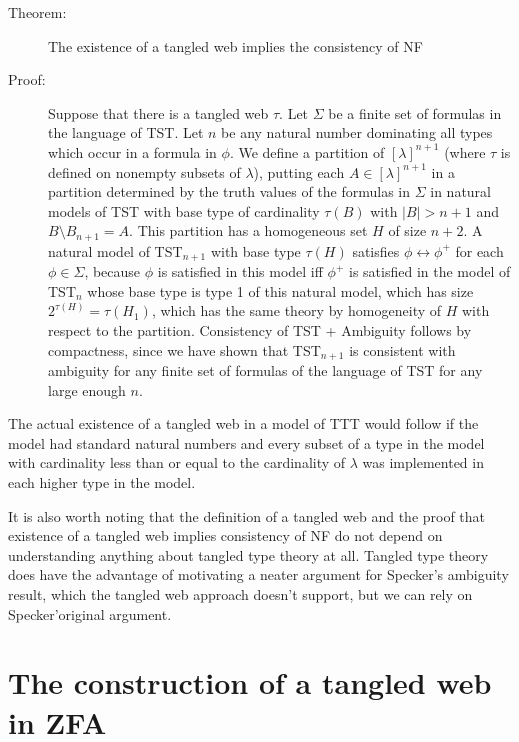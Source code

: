 \documentclass[12pt]{article}
\begin{document}
\begin{description}

\item[Theorem:]  The existence of a tangled web implies the consistency of NF

\item[Proof:]  Suppose that there is a tangled web $\tau$.  Let $\Sigma$ be a finite set of formulas in the language of TST.  Let $n$ be any natural number dominating all types which occur
in a formula in $\phi$.  We define a partition of $[\lambda]^{n+1}$ (where $\tau$ is defined on nonempty subsets of $\lambda$), putting each $A \in [\lambda]^{n+1}$ in a partition
determined by the truth values of the formulas in $\Sigma$ in natural models of TST with base type of cardinality $\tau(B)$ with $|B| > n+1$ and $B \setminus B_{n+1}=A$.  This partition has a homogeneous set $H$ of size $n+2$.  A natural model of TST$_{n+1}$ with base type $\tau(H)$ satisfies $\phi \leftrightarrow \phi^+$ for each $\phi \in \Sigma$, because
$\phi$ is satisfied in this model iff $\phi^+$ is satisfied in the model  of TST$_n$ whose base type is type 1 of this natural model, which has size $2^{\tau(H)} = \tau(H_1)$, which has the same theory by homogeneity of $H$ with respect to the partition.  Consistency of TST + Ambiguity follows by compactness, since we have shown that TST$_{n+1}$ is consistent with ambiguity for any finite set of formulas of the language of TST for any large enough $n$.

\end{description}

The actual existence of a tangled web in a model of TTT would follow if the model had standard natural numbers and every subset of a type in the model with cardinality less than or equal to the cardinality of $\lambda$  was implemented in each higher type in the model.

It is also worth noting that the definition of a tangled web and the proof that existence of a tangled web implies consistency of NF do not depend on understanding anything about tangled type theory at all.  Tangled type theory does have the advantage of motivating a neater argument for Specker's ambiguity result, which the tangled web approach doesn't support, but we can rely on Specker'original argument.

\newpage

\section{The construction of a tangled web in ZFA}
\end{document}
